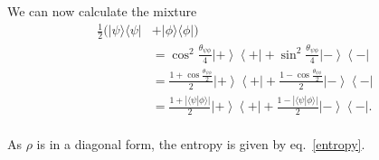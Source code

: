 \documentclass[10pt,twocolumn, nofootinbib]{revtex4-1}
\begin{document}
We can now calculate the mixture
\begin{align*}
	\frac{1}{2}(|\psi\rangle\langle\psi| &+ |\phi\rangle\langle\phi|) \\
	&=\cos^2\frac{\theta_{\psi\phi}}{4}\left|+\right>\left<+\right| +\sin^2\frac{\theta_{\psi\phi}}{4}\left|-\right>\left<-\right| \\
	&=\frac{1+\cos\frac{\theta_{\psi\phi}}{2}}{2}\left|+\right>\left<+\right| +\frac{1-\cos\frac{\theta_{\psi\phi}}{2}}{2}\left|-\right>\left<-\right| \\
	&=\frac{1+|\langle\psi|\phi\rangle|}{2}\left|+\right>\left<+\right| +\frac{1-|\langle\psi|\phi\rangle|}{2}\left|-\right>\left<-\right|. \\
\end{align*}

As $\rho$ is in a diagonal form, the entropy is given by eq.~\ref{entropy}.
\end{document}
